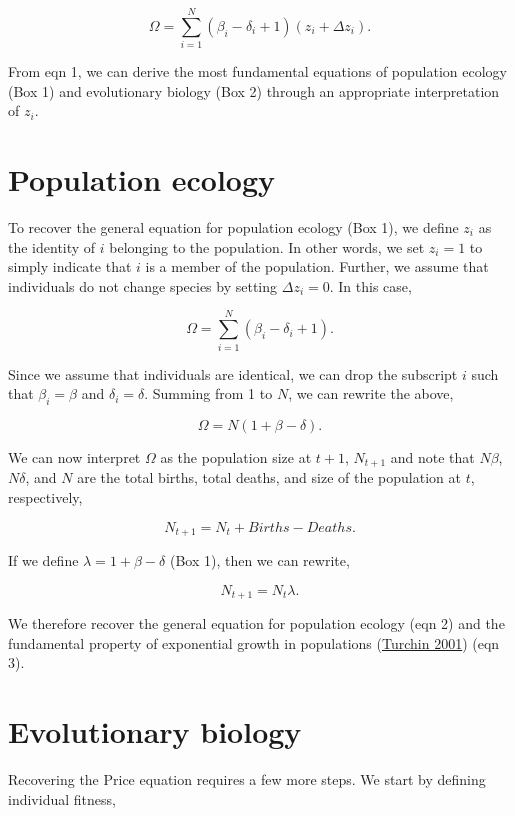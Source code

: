 \documentclass[
]{article}
\begin{document}
\[\Omega = \sum_{i=1}^{N} \left(\beta_{i} - \delta_{i} + 1 \right)\left(z_{i} + \Delta z_{i} \right).
\tag{1}
\]

From eqn 1, we can derive the most fundamental equations of population
ecology (Box 1) and evolutionary biology (Box 2) through an appropriate
interpretation of \(z_{i}\).

\hypertarget{population-ecology}{%
\section{Population ecology}\label{population-ecology}}

To recover the general equation for population ecology (Box 1), we
define \(z_{i}\) as the identity of \(i\) belonging to the population.
In other words, we set \(z_{i} = 1\) to simply indicate that \(i\) is a
member of the population. Further, we assume that individuals do not
change species by setting \(\Delta z_{i} = 0\). In this case,

\[\Omega = \sum_{i=1}^{N} \left(\beta_{i} - \delta_{i} + 1 \right).\]

Since we assume that individuals are identical, we can drop the
subscript \(i\) such that \(\beta_{i} = \beta\) and
\(\delta_{i} = \delta\). Summing from 1 to \(N\), we can rewrite the
above,

\[\Omega = N\left(1 + \beta - \delta \right).\]

We can now interpret \(\Omega\) as the population size at \(t+1\),
\(N_{t+1}\) and note that \(N\beta\), \(N\delta\), and \(N\) are the
total births, total deaths, and size of the population at \(t\),
respectively,

\[N_{t+1} = N_{t} + Births - Deaths.
\tag{2}
\]

If we define \(\lambda = 1 + \beta - \delta\) (Box 1), then we can
rewrite,

\[N_{t+1} = N_{t}\lambda.
\tag{3}
\]

We therefore recover the general equation for population ecology (eqn 2)
and the fundamental property of exponential growth in populations
(\protect\hyperlink{ref-Turchin2001}{Turchin 2001}) (eqn 3).

\hypertarget{evolutionary-biology}{%
\section{Evolutionary biology}\label{evolutionary-biology}}

Recovering the Price equation requires a few more steps. We start by
defining individual fitness,
\end{document}
